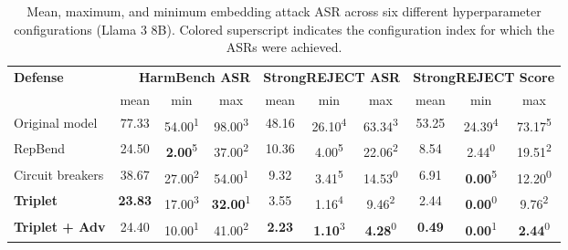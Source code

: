 \documentclass[11pt]{article}
\begin{document}
\begin{table}
\centering
\begin{tabular}{lccccccccc}
\hline
\textbf{Defense} & \multicolumn{3}{r}{\textbf{HarmBench ASR}} & \multicolumn{3}{r}{\textbf{StrongREJECT ASR}} & \multicolumn{3}{r}{\textbf{StrongREJECT Score}} \\
 & mean & {min} & {max} & {mean} & {min} & {max} & {mean} & {min} & {max} \\
\hline
Original model & 77.33 & 54.00\textsuperscript{\textcolor{conf1}{1}} & 98.00\textsuperscript{\textcolor{conf3}{3}} & 48.16 & 26.10\textsuperscript{\textcolor{conf4}{4}} & 63.34\textsuperscript{\textcolor{conf3}{3}} & 53.25 & 24.39\textsuperscript{\textcolor{conf4}{4}} & 73.17\textsuperscript{\textcolor{conf5}{5}} \\
RepBend & 24.50 & \textbf{2.00}\textsuperscript{\textcolor{conf5}{5}} & 37.00\textsuperscript{\textcolor{conf2}{2}} & 10.36 & 4.00\textsuperscript{\textcolor{conf5}{5}} & 22.06\textsuperscript{\textcolor{conf2}{2}} & 8.54 & 2.44\textsuperscript{\textcolor{conf0}{0}} & 19.51\textsuperscript{\textcolor{conf2}{2}} \\
Circuit breakers & 38.67 & 27.00\textsuperscript{\textcolor{conf2}{2}} & 54.00\textsuperscript{\textcolor{conf1}{1}} & 9.32 & 3.41\textsuperscript{\textcolor{conf5}{5}} & 14.53\textsuperscript{\textcolor{conf0}{0}} & 6.91 & \textbf{0.00}\textsuperscript{\textcolor{conf5}{5}} & 12.20\textsuperscript{\textcolor{conf0}{0}} \\
\hline
\textbf{Triplet} & \textbf{23.83} & 17.00\textsuperscript{\textcolor{conf3}{3}} & \textbf{32.00}\textsuperscript{\textcolor{conf1}{1}} & 3.55 & 1.16\textsuperscript{\textcolor{conf4}{4}} & 9.46\textsuperscript{\textcolor{conf2}{2}} & 2.44 & \textbf{0.00}\textsuperscript{\textcolor{conf0}{0}} & 9.76\textsuperscript{\textcolor{conf2}{2}} \\
\textbf{Triplet + Adv} & 24.40 & 10.00\textsuperscript{\textcolor{conf1}{1}} & 41.00\textsuperscript{\textcolor{conf2}{2}} & \textbf{2.23} & \textbf{1.10}\textsuperscript{\textcolor{conf3}{3}} & \textbf{4.28}\textsuperscript{\textcolor{conf0}{0}} & \textbf{0.49} & \textbf{0.00}\textsuperscript{\textcolor{conf1}{1}} & \textbf{2.44}\textsuperscript{\textcolor{conf0}{0}} \\
\hline
\end{tabular}
\caption{Mean, maximum, and minimum embedding attack ASR across six different hyperparameter configurations (Llama 3 8B). Colored superscript indicates the configuration index for which the ASRs were achieved.
}
\label{tab:robustness}
\end{table}
\end{document}
